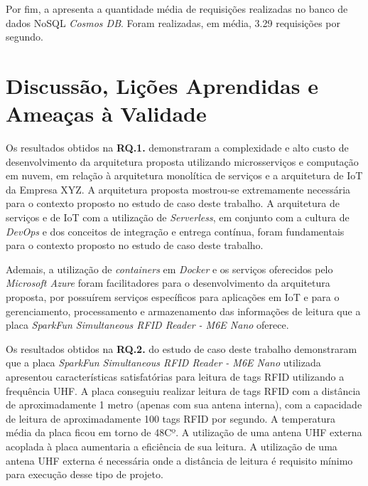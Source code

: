 
Por fim, a  apresenta a quantidade média de requisições realizadas no banco de dados \acrshort{NoSQL} \textit{Cosmos DB}. Foram realizadas, em média, 3.29 requisições por segundo.


\section{Discussão, Lições Aprendidas e Ameaças à Validade}

Os resultados obtidos na \textbf{RQ.1.} demonstraram a complexidade e alto custo de desenvolvimento da arquitetura proposta utilizando microsserviços e computação em nuvem, em relação à arquitetura monolítica de serviços e a arquitetura de \acrshort{IoT} da Empresa XYZ. A arquitetura proposta mostrou-se extremamente necessária para o contexto proposto no estudo de caso deste trabalho. A arquitetura de serviços e de \acrshort{IoT} com a utilização de \textit{Serverless}, em conjunto com a cultura de \textit{DevOps} e dos conceitos de integração e entrega contínua, foram fundamentais para o contexto proposto no estudo de caso deste trabalho.

Ademais, a utilização de \textit{containers} em \textit{Docker} e os serviços oferecidos pelo \textit{Microsoft Azure} foram facilitadores para o desenvolvimento da arquitetura proposta, por possuírem serviços específicos para aplicações em \acrshort{IoT} e para o gerenciamento, processamento e armazenamento das informações de leitura que a placa \textit{SparkFun Simultaneous RFID Reader - M6E Nano} oferece.

Os resultados obtidos na \textbf{RQ.2.} do estudo de caso deste trabalho demonstraram que a placa \textit{SparkFun Simultaneous RFID Reader - M6E Nano} utilizada apresentou características satisfatórias para leitura de tags \acrshort{RFID} utilizando a frequência \acrshort{UHF}. A placa conseguiu realizar leitura de tags RFID com a distância de aproximadamente 1 metro (apenas com sua antena interna), com a capacidade de leitura de aproximadamente 100 tags RFID por segundo. A temperatura média da placa ficou em torno de 48Cº. A utilização de uma antena UHF externa acoplada à placa aumentaria a eficiência de sua leitura. A utilização de uma antena \acrshort{UHF} externa é necessária onde a distância de leitura é requisito mínimo para execução desse tipo de projeto.

